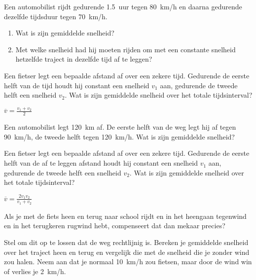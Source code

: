 \documentclass{ximera}
\begin{document}
	\author{Bart Lambregs}
    \xmsource\xmuitleg

\begin{exercise}
    Een automobilist rijdt gedurende \SI{1,5}{uur} tegen \SI{80}{km/h} en daarna gedurende dezelfde tijdsduur tegen
    \SI{70}{km/h}.
    \begin{enumerate}
        \item Wat is zijn gemiddelde snelheid?
        \item Met welke snelheid had hij moeten rijden om met een constante snelheid hetzelfde traject in dezelfde tijd af te leggen?
    \end{enumerate}
    \begin{exercise}
        Een fietser legt een bepaalde afstand af over een zekere tijd. Gedurende de eerste helft van de tijd houdt hij constant een snelheid $v_1$ aan, gedurende de tweede helft een snelheid $v_2$. Wat is zijn gemiddelde snelheid over het totale tijdsinterval?
        \begin{oplossing}
            $\overline{v}=\frac{v_1+v_2}{2}$
        \end{oplossing}
\end{exercise}
\end{exercise}

\begin{exercise}
    Een automobilist legt \SI{120}{km} af. De eerste helft van de weg legt hij af tegen \SI{90}{km/h}, de tweede helft tegen \SI{120}{km/h}. Wat is zijn gemiddelde snelheid?
    \begin{exercise}
        Een fietser legt een bepaalde afstand af over een zekere tijd. Gedurende de eerste helft van de af te leggen afstand houdt hij constant een snelheid $v_1$ aan, gedurende de tweede helft een snelheid $v_2$. Wat is zijn gemiddelde snelheid over het totale tijdsinterval? 
    \begin{oplossing}
        $\overline{v}=\frac{2v_1v_2}{v_1+v_2}$
    \end{oplossing}
\end{exercise}
\end{exercise}

\begin{exercise}
    Als je met de fiets heen en terug naar school rijdt en in het heengaan tegenwind en in het terugkeren rugwind hebt, compenseert dat dan mekaar precies?

    Stel om dit op te lossen dat de weg rechtlijnig is. Bereken je gemiddelde snelheid over het traject heen en terug en vergelijk die met de snelheid die je zonder wind zou halen. Neem aan dat je normaal \SI{10}{km/h} zou fietsen, maar door de wind win of verlies je \SI{2}{km/h}.
    \begin{multipleChoice}
    \end{multipleChoice}
\end{exercise}
\end{document}
